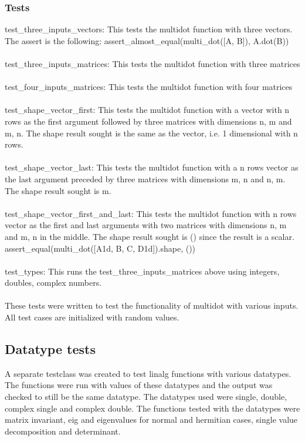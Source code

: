 \documentclass[a4paper,11pt]{article}
\begin{document}
\subsubsection{Tests}
test\_three\_inputs\_vectors: This tests the multidot function with three vectors. The assert is the following: assert\_almost\_equal(multi\_dot([A, B]), A.dot(B))\\
\\
test\_three\_inputs\_matrices: This tests the multidot function with three matrices\\
\\
test\_four\_inputs\_matrices: This tests the multidot function with four matrices\\
\\
test\_shape\_vector\_first: This tests the multidot function with a vector with n rows as the first argument followed by three matrices with dimensions n, m and m, n. The shape result sought is the same as the vector, i.e. 1 dimensional with n rows. \\
\\
test\_shape\_vector\_last: This tests the multidot function with a n rows vector as the last argument preceded by three matrices with dimensions m, n and n, m. The shape result sought is m. \\
\\
test\_shape\_vector\_first\_and\_last: This tests the multidot function with n rows vector as the first and last arguments with two matrices with dimensions n, m and m, n in the middle. The shape result sought is () since the result is a scalar. assert\_equal(multi\_dot([A1d, B, C, D1d]).shape, ())\\
\\
test\_types: This runs the test\_three\_inputs\_matrices above using integers, doubles, complex numbers. \\
\\
These tests were written to test the functionality of multidot with various inputs. All test cases are initialized with random values. 

\subsection{Datatype tests}
A separate testclass was created to test linalg functions with various datatypes. The functions were run with values of these datatypes and the output was checked to still be the same datatype. The datatypes used were single, double, complex single and complex double. The functions tested with the datatypes were matrix invariant, eig and eigenvalues for normal and hermitian cases, single value decomposition and determinant.  
\end{document}
